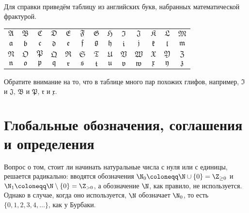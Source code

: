 \documentclass[
	extrafontsizes,
	11pt,
	hyphens,
]{memoir}
\begin{document}
Для справки приведём таблицу из английских букв, набранных математической фрактурой.
\begin{center}
\begin{tabular}{ c c c c c c c c c c c c c }
\(\mathfrak{A}\) &
\(\mathfrak{B}\) &
\(\mathfrak{C}\) &
\(\mathfrak{D}\) &
\(\mathfrak{E}\) &
\(\mathfrak{F}\) &
\(\mathfrak{G}\) &
\(\mathfrak{H}\) &
\(\mathfrak{I}\) &
\(\mathfrak{J}\) &
\(\mathfrak{K}\) &
\(\mathfrak{L}\) &
\(\mathfrak{M}\) \\
\(\mathfrak{a}\) &
\(\mathfrak{b}\) &
\(\mathfrak{c}\) &
\(\mathfrak{d}\) &
\(\mathfrak{e}\) &
\(\mathfrak{f}\) &
\(\mathfrak{g}\) &
\(\mathfrak{h}\) &
\(\mathfrak{i}\) &
\(\mathfrak{j}\) &
\(\mathfrak{k}\) &
\(\mathfrak{l}\) &
\(\mathfrak{m}\) \\[\medskipamount]
\(\mathfrak{N}\) &
\(\mathfrak{O}\) &
\(\mathfrak{P}\) &
\(\mathfrak{Q}\) &
\(\mathfrak{R}\) &
\(\mathfrak{S}\) &
\(\mathfrak{T}\) &
\(\mathfrak{U}\) &
\(\mathfrak{V}\) &
\(\mathfrak{W}\) &
\(\mathfrak{X}\) &
\(\mathfrak{Y}\) &
\(\mathfrak{Z}\) \\
\(\mathfrak{n}\) &
\(\mathfrak{o}\) &
\(\mathfrak{p}\) &
\(\mathfrak{q}\) &
\(\mathfrak{r}\) &
\(\mathfrak{s}\) &
\(\mathfrak{t}\) &
\(\mathfrak{u}\) &
\(\mathfrak{v}\) &
\(\mathfrak{w}\) &
\(\mathfrak{x}\) &
\(\mathfrak{y}\) &
\(\mathfrak{z}\)
\end{tabular}
\end{center}
Обратите внимание на то, что в таблице много пар похожих глифов, например, \(\mathfrak{I}\) и \(\mathfrak{J}\), \(\mathfrak{B}\) и \(\mathfrak{P}\), \(\mathfrak{r}\) и \(\mathfrak{x}\).


\section{Глобальные обозначения, соглашения и определения}

\begin{notation}
Вопрос о том, стоит ли начинать натуральные числа с нуля или с единицы, решается радикально: вводятся обозначения
\(\N_0 \coloneqq \N \cup \{0\} = \Z_{\geq 0}\) и
\(\N_1 \coloneqq \N \setminus \{0\} = \Z_{> 0}\),
а обозначение \(\N\), как правило, не используется.
Однако в случае, когда оно используется, \(\N\) обозначает \(\N_0\), то есть \(\{0, 1, 2, 3, 4, \dots{}\}\), как у Бурбаки.
\end{notation}
\end{document}

